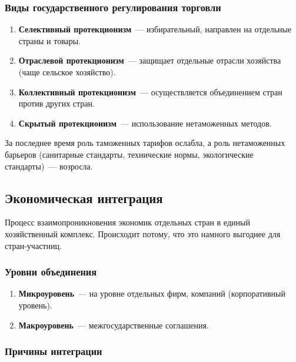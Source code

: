 \documentclass[12pt]{article}
\begin{document}
    \subsubsection{Виды государственного регулирования торговли}
    
    \begin{enumerate}
    	\item \textbf{Селективный протекционизм}~--- избирательный, направлен на отдельные страны и товары.
    	\item \textbf{Отраслевой протекционизм}~--- защищает отдельные отрасли хозяйства (чаще сельское хозяйство).
    	\item \textbf{Коллективный протекционизм}~--- осуществляется объединением стран против других стран.
    	\item \textbf{Скрытый протекционизм}~--- использование нетаможенных методов.
    \end{enumerate}
    
    \begin{note}
    	За последнее время роль таможенных тарифов ослабла, а роль нетаможенных барьеров (санитарные стандарты, технические нормы, экологические стандарты)~--- возросла.
    \end{note}
    
    \subsection{Экономическая интеграция}
    
    \begin{definition}
    	Процесс взаимопроникновения экономик отдельных стран в единый хозяйственный комплекс. Происходит потому, что это намного выгоднее для стран-участниц.
    \end{definition}
    
    \subsubsection{Уровни объединения}
    
    \begin{enumerate}
    	\item \textbf{Микроуровень}~--- на уровне отдельных фирм, компаний (корпоративный уровень).
    	\item \textbf{Макроуровень}~--- межгосударственные соглашения.
    \end{enumerate}
    
    \subsubsection{Причины интеграции}
    
\end{document}

